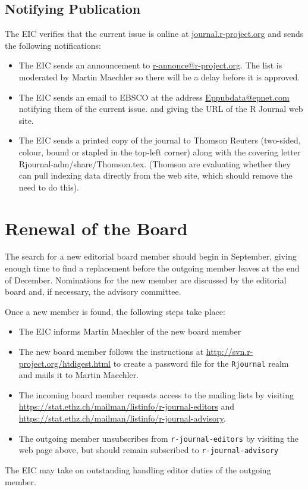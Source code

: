 \documentclass[11pt]{article}
\begin{document}
\subsection{Notifying Publication}

The EIC verifies that the current issue is online at
\url{journal.r-project.org} and sends the following notifications:
\begin{itemize}
\item The EIC sends an announcement to
  \url{r-annonce@r-project.org}. The list is moderated by Martin
  Maechler so there will be a delay before it is approved.
\item The EIC sends an email to EBSCO at the address 
  \url{Eppubdata@epnet.com} notifying them of the current issue.
  and giving the URL of the R Journal web site.
\item The EIC sends a printed copy of the journal to Thomson Reuters
  (two-sided, colour, bound or stapled in the top-left corner) along
  with the covering letter Rjournal-adm/share/Thomson.tex.
  (Thomson are evaluating whether they can pull indexing data directly
  from the web site, which should remove the need to do this).
\end{itemize}

\section{Renewal of the Board}

The search for a new editorial board member should begin in September,
giving enough time to find a replacement before the outgoing member
leaves at the end of December.  Nominations for the new member are
discussed by the editorial board and, if necessary, the advisory
committee.

Once a new member is found, the following steps take place:
\begin{itemize}
\item The EIC informs Martin Maechler of the new board member
\item The new board member follows the instructions at 
\url{http://svn.r-project.org/htdigest.html} to create a password file
for the \texttt{Rjournal} realm and mails it to Martin Maechler.
\item The incoming board member requests access to the mailing lists by
visiting \url{https://stat.ethz.ch/mailman/listinfo/r-journal-editors}
and \url{https://stat.ethz.ch/mailman/listinfo/r-journal-advisory}.
\item The outgoing member unsubscribes from \texttt{r-journal-editors}
  by visiting the web page above, but should remain subscribed to
  \texttt{r-journal-advisory}
\end{itemize}
The EIC may take on outstanding handling editor duties of the outgoing
member.
\end{document}
